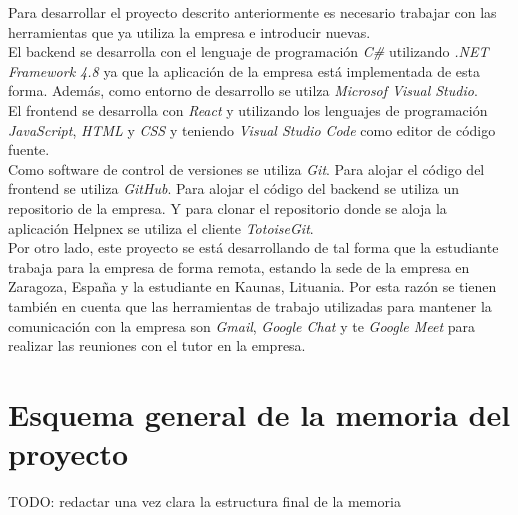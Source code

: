 
Para desarrollar el proyecto descrito anteriormente es necesario trabajar con las herramientas que ya utiliza la empresa e introducir nuevas.\\

El backend se desarrolla con el lenguaje de programación \textit{C\#} utilizando \textit{.NET Framework 4.8} ya que la aplicación de la empresa está implementada de esta forma. Además, como entorno de desarrollo se utilza \textit{Microsof Visual Studio}.\\

El frontend se desarrolla con \textit{React} y utilizando los lenguajes de programación \textit{JavaScript}, \textit{HTML} y \textit{CSS} y teniendo \textit{Visual Studio Code} como editor de código fuente.\\

Como software de control de versiones se utiliza \textit{Git}. Para alojar el código del frontend se utiliza \textit{GitHub}. Para alojar el código del backend se utiliza un repositorio de la empresa. Y para clonar el repositorio donde se aloja la aplicación Helpnex se utiliza el cliente \textit{TotoiseGit}.\\

Por otro lado, este proyecto se está desarrollando de tal forma que la estudiante trabaja para la empresa de forma remota, estando la sede de la empresa en Zaragoza, España y la estudiante en Kaunas, Lituania. Por esta razón se tienen también en cuenta que las herramientas de trabajo utilizadas para mantener la comunicación con la empresa son \textit{Gmail}, \textit{Google Chat} y te \textit{Google Meet} para realizar las reuniones con el tutor en la empresa.

\section{Esquema general de la memoria del proyecto}


TODO: redactar una vez clara la estructura final de la memoria








